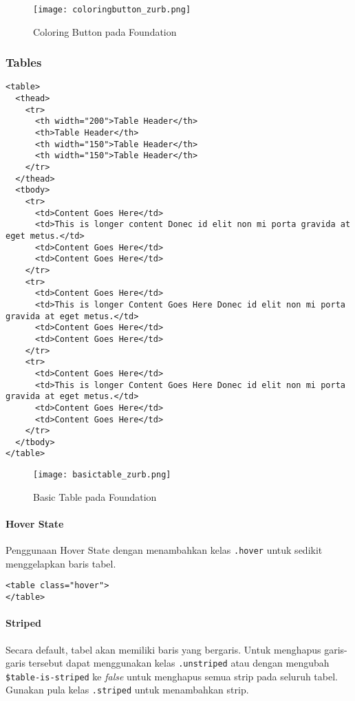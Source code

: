 \begin{figure} [H]
	\centering  
	\texttt{[image: coloringbutton\_zurb.png]}  
	\caption{Coloring Button pada Foundation}
	\label{fig:gridbasic_zurb} 
\end{figure}

\subsubsection{Tables}
\label{sssec:css_2}
\begin{lstlisting}[frame=single] 
<table>
  <thead>
    <tr>
      <th width="200">Table Header</th>
      <th>Table Header</th>
      <th width="150">Table Header</th>
      <th width="150">Table Header</th>
    </tr>
  </thead>
  <tbody>
    <tr>
      <td>Content Goes Here</td>
      <td>This is longer content Donec id elit non mi porta gravida at eget metus.</td>
      <td>Content Goes Here</td>
      <td>Content Goes Here</td>
    </tr>
    <tr>
      <td>Content Goes Here</td>
      <td>This is longer Content Goes Here Donec id elit non mi porta gravida at eget metus.</td>
      <td>Content Goes Here</td>
      <td>Content Goes Here</td>
    </tr>
    <tr>
      <td>Content Goes Here</td>
      <td>This is longer Content Goes Here Donec id elit non mi porta gravida at eget metus.</td>
      <td>Content Goes Here</td>
      <td>Content Goes Here</td>
    </tr>
  </tbody>
</table>
\end{lstlisting}

\begin{figure} [H]
	\centering  
	\texttt{[image: basictable\_zurb.png]}  
	\caption{Basic Table pada Foundation}
	\label{fig:gridbasic_zurb} 
\end{figure}

\paragraph{Hover State}
Penggunaan Hover State dengan menambahkan kelas \texttt{.hover} untuk sedikit menggelapkan baris tabel.
\begin{lstlisting}[frame=single] 
<table class="hover">
</table>
\end{lstlisting}

\paragraph{Striped}
Secara default, tabel akan memiliki baris yang bergaris. Untuk menghapus garis-garis tersebut dapat menggunakan kelas \texttt{.unstriped} atau dengan mengubah \verb|$table-is-striped| ke \textit{false} untuk menghapus semua strip pada seluruh tabel. Gunakan pula kelas \texttt{.striped} untuk menambahkan strip.\cite{zurbfoundation:17}

